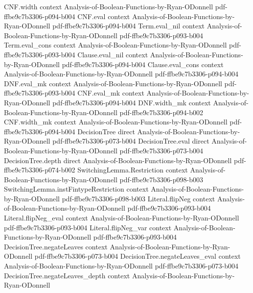 \begin{lemma}
\proofstep
  {CNF.width}
  {context}
  {Analysis-of-Boolean-Functions-by-Ryan-ODonnell}
  {pdf-ffbe9c7b3306-p094-b004}
\proofstep
  {CNF.eval}
  {context}
  {Analysis-of-Boolean-Functions-by-Ryan-ODonnell}
  {pdf-ffbe9c7b3306-p094-b004}
\proofstep
  {Term.eval_nil}
  {context}
  {Analysis-of-Boolean-Functions-by-Ryan-ODonnell}
  {pdf-ffbe9c7b3306-p093-b004}
\proofstep
  {Term.eval_cons}
  {context}
  {Analysis-of-Boolean-Functions-by-Ryan-ODonnell}
  {pdf-ffbe9c7b3306-p093-b004}
\proofstep
  {Clause.eval_nil}
  {context}
  {Analysis-of-Boolean-Functions-by-Ryan-ODonnell}
  {pdf-ffbe9c7b3306-p094-b004}
\proofstep
  {Clause.eval_cons}
  {context}
  {Analysis-of-Boolean-Functions-by-Ryan-ODonnell}
  {pdf-ffbe9c7b3306-p094-b004}
\proofstep
  {DNF.eval_mk}
  {context}
  {Analysis-of-Boolean-Functions-by-Ryan-ODonnell}
  {pdf-ffbe9c7b3306-p093-b004}
\proofstep
  {CNF.eval_mk}
  {context}
  {Analysis-of-Boolean-Functions-by-Ryan-ODonnell}
  {pdf-ffbe9c7b3306-p094-b004}
\proofstep
  {DNF.width_mk}
  {context}
  {Analysis-of-Boolean-Functions-by-Ryan-ODonnell}
  {pdf-ffbe9c7b3306-p094-b002}
\proofstep
  {CNF.width_mk}
  {context}
  {Analysis-of-Boolean-Functions-by-Ryan-ODonnell}
  {pdf-ffbe9c7b3306-p094-b004}
\proofstep
  {DecisionTree}
  {direct}
  {Analysis-of-Boolean-Functions-by-Ryan-ODonnell}
  {pdf-ffbe9c7b3306-p073-b004}
\proofstep
  {DecisionTree.eval}
  {direct}
  {Analysis-of-Boolean-Functions-by-Ryan-ODonnell}
  {pdf-ffbe9c7b3306-p073-b004}
\proofstep
  {DecisionTree.depth}
  {direct}
  {Analysis-of-Boolean-Functions-by-Ryan-ODonnell}
  {pdf-ffbe9c7b3306-p074-b002}
\proofstep
  {SwitchingLemma.Restriction}
  {context}
  {Analysis-of-Boolean-Functions-by-Ryan-ODonnell}
  {pdf-ffbe9c7b3306-p098-b003}
\proofstep
  {SwitchingLemma.instFintypeRestriction}
  {context}
  {Analysis-of-Boolean-Functions-by-Ryan-ODonnell}
  {pdf-ffbe9c7b3306-p098-b003}
\proofstep
  {Literal.flipNeg}
  {context}
  {Analysis-of-Boolean-Functions-by-Ryan-ODonnell}
  {pdf-ffbe9c7b3306-p093-b004}
\proofstep
  {Literal.flipNeg_eval}
  {context}
  {Analysis-of-Boolean-Functions-by-Ryan-ODonnell}
  {pdf-ffbe9c7b3306-p093-b004}
\proofstep
  {Literal.flipNeg_var}
  {context}
  {Analysis-of-Boolean-Functions-by-Ryan-ODonnell}
  {pdf-ffbe9c7b3306-p093-b004}
\proofstep
  {DecisionTree.negateLeaves}
  {context}
  {Analysis-of-Boolean-Functions-by-Ryan-ODonnell}
  {pdf-ffbe9c7b3306-p073-b004}
\proofstep
  {DecisionTree.negateLeaves_eval}
  {context}
  {Analysis-of-Boolean-Functions-by-Ryan-ODonnell}
  {pdf-ffbe9c7b3306-p073-b004}
\proofstep
  {DecisionTree.negateLeaves_depth}
  {context}
  {Analysis-of-Boolean-Functions-by-Ryan-ODonnell}

\end{lemma}
